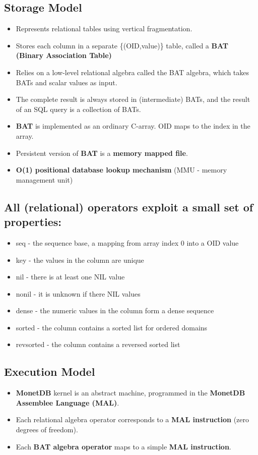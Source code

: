 \documentclass[11pt]{article}
\begin{document}
\subsection{Storage Model}
\label{sec:org05ee127}
\begin{itemize}
\item Represents relational tables using vertical fragmentation.
\item Stores each column in a separate \{(OID,value)\} table,  called a \textbf{BAT (Binary Association Table)}
\item Relies on a low-level relational algebra called the BAT algebra, which takes BATs and scalar values as input.
\item The complete result is always stored in (intermediate) BATs, and the result of an SQL query is a collection of BATs.

\item \textbf{BAT} is implemented as an ordinary C-array. OID maps to the index in the array.
\item Persistent version of \textbf{BAT} is a \textbf{memory mapped file}.
\item \textbf{O(1) positional database lookup mechanism} (MMU - memory management unit)
\end{itemize}

\subsection{All (relational) operators exploit a small set of properties:}
\label{sec:org3c3b01a}
\begin{itemize}
\item seq       - the sequence base, a mapping from array index 0 into a OID value
\item key       - the values in the column are unique
\item nil       - there is at least one NIL value
\item nonil     - it is unknown if there NIL values
\item dense     - the numeric values in the column form a dense sequence
\item sorted    - the column contains a sorted list for ordered domains
\item revsorted - the column contains a reversed sorted list
\end{itemize}

\subsection{Execution Model}
\label{sec:org40eb6ad}
\begin{itemize}
\item \textbf{MonetDB} kernel is an abstract machine, programmed in the \textbf{MonetDB Assemblee Language (MAL)}.
\item Each relational algebra operator corresponds to a \textbf{MAL instruction} (zero degrees of freedom).
\item Each \textbf{BAT algebra operator} maps to a simple \textbf{MAL instruction}.
\end{itemize}
\end{document}
